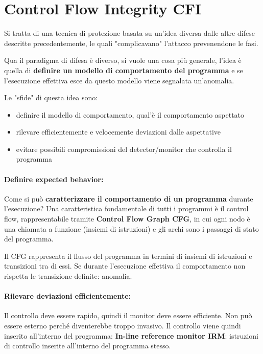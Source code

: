 \section{Control Flow Integrity CFI}
\label{sec:cfi}

Si tratta di una tecnica di protezione basata su un'idea diversa dalle altre difese descritte precedentemente, le quali "complicavano" l'attacco prevenendone le fasi. 

Qua il paradigma di difesa è diverso, si vuole una cosa più generale, l'idea è quella di \textbf{definire un modello di comportamento del programma} e se l'esecuzione effettiva esce da questo modello viene segnalata un'anomalia.

Le "sfide" di questa idea sono: 
\begin{itemize}
	\item definire il modello di comportamento, qual'è il comportamento aspettato
	
    \item rilevare efficientemente e velocemente deviazioni dalle aspettative
	
    \item evitare possibili compromissioni del detector/monitor che controlla il programma
\end{itemize}

\paragraph{Definire expected behavior:} Come si può \textbf{caratterizzare il comportamento di un programma} durante l'esecuzione? Una caratteristica fondamentale di tutti i programmi è il control flow, rappresentabile tramite \textbf{Control Flow Graph CFG}, in cui ogni nodo è una chiamata a funzione (insiemi di istruzioni) e gli archi sono i passaggi di stato del programma. 

Il CFG rappresenta il flusso del programma in termini di insiemi di istruzioni e transizioni tra di essi. Se durante l'esecuzione effettiva il comportamento non rispetta le transizione definite: anomalia.

\paragraph{Rilevare deviazioni efficientemente:} Il controllo deve essere rapido, quindi il monitor deve essere efficiente. Non può essere esterno perché diventerebbe troppo invasivo. Il controllo viene quindi inserito all'interno del programma: \textbf{In-line reference monitor IRM}: istruzioni di controllo inserite all'interno del programma stesso. 

